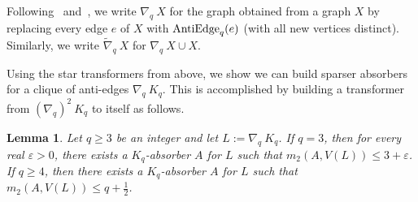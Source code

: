 \documentclass[11pt]{article}
\numberwithin{equation}{section}
\newcounter{i}
\theoremstyle{plain}
\newtheorem{lem}[thm]{Lemma}
\theoremstyle{plain} %
\theoremstyle{definition}
\begin{document}

Following~\cite{GKLO16} and~\cite{BGKLMO20}, we write $\nabla_q~X$ for the graph obtained from a graph $X$ by replacing every edge $e$ of $X$ with ${\rm AntiEdge}_q(e)$ (with all new vertices distinct).
Similarly, we write $\tilde{\nabla}_q~X$ for $\nabla_q~X \cup X$.

Using the star transformers from above, we show we can build sparser absorbers for a clique of anti-edges $\nabla_q~K_q$. This is accomplished by building a transformer from $(\nabla_q)^2~K_q$ to itself as follows. 

\begin{lem}\label{lem:SparseAntiCliqueAbsorber}
Let $q\ge 3$ be an integer and let $L:=\nabla_q~K_q$. If $q=3$, then for every real $\varepsilon > 0$, there exists a $K_q$-absorber $A$ for $L$ such that $m_2(A,V(L))\le 3+\varepsilon$. If $q\ge 4$, then there exists a $K_q$-absorber $A$ for $L$ such that $m_2(A,V(L))\le q+\frac{1}{2}$.
\end{lem}
\end{document}
